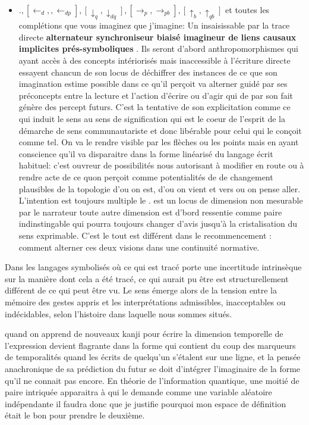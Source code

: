 \documentclass{article}
\begin{document}
\begin{itemize}
\begin{itemize}
  \end{itemize}
  \item $.,[\leftarrow_d, ,\leftarrow_{dp}],[\downarrow_q,\downarrow_{dq}],[\rightarrow_p,\rightarrow_{pb}],[\uparrow_{b},\uparrow_{qb}]$ et toutes les complétions que vous imaginez que j'imagine: Un  insaisissable par la trace directe   \textbf {alternateur synchroniseur biaisé imagineur de liens causaux implicites prés-symboliques }. Ils seront  d'abord anthropomorphismes qui ayant accès à des concepts intériorisés mais inaccessible à l'écriture directe essayent chancun de son locus  de déchiffrer des instances de ce que son imagination estime possible dans ce qu'il perçoit va alterner guidé par ses préconcepts   entre la lecture et l'action d'écrire ou d'agir qui de par son fait génère des percept futurs. C'est la tentative de son explicitation comme ce qui induit le sens au sens de signification qui est le coeur de l'esprit de la démarche de sens communautariste et donc libérable pour celui qui le conçoit comme tel. On va le rendre visible par les flèches ou les  points mais en ayant conscience qu'il va disparaitre dans la forme linéarisé du langage écrit habituel: c'est ouvreur de possibilités nous autorisant  à modifier en route ou à rendre acte de ce quon perçoit comme potentialités de de changement plausibles de la topologie d'ou on est, d'ou on vient  et vers ou on pense aller. L'intention est toujours multiple le . est un locus de dimension non mesurable par le narrateur toute autre dimension est d'bord ressentie comme paire indinstingable qui pourra toujours changer d'avis jusqu'à la cristalisation du sens exprimable. C'est le tout est différent dans le recommencement : comment alterner ces deux visions dans une continuité normative. 
  \end{itemize}


Dans les langages symbolisés où ce qui est tracé porte une incertitude intrinsèque sur la manière dont cela a été tracé, ce qui aurait pu être est structurellement différent de ce qui peut être vu. Le sens émerge alors de la tension entre la mémoire des gestes appris et les interprétations admissibles, inacceptables ou indécidables, selon l’histoire dans laquelle nous sommes situés.

 
 quand on apprend de nouveaux kanji pour écrire la dimension temporelle de l'expression devient flagrante dans la forme qui contient du coup des marqueurs de temporalités quand les écrits de quelqu'un s'étalent sur une ligne, et la pensée anachronique de sa prédiction du futur se doit d'intégrer l'imaginaire de la forme qu'il ne connait pas encore.
En théorie de l'information quantique,   une moitié de paire intriquée apparaitra à qui le demande comme une variable aléatoire indépendante  il faudra donc que je justifie pourquoi mon espace de définition était le bon pour prendre le deuxième.
\end{document}
